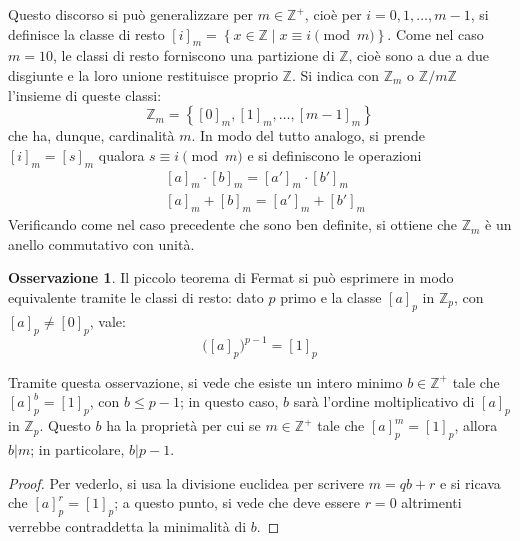 \documentclass[11pt, a4paper]{scrartcl}
\theoremstyle{definition}
\numberwithin{esempio}{section}
\theoremstyle{definition}
\newtheorem{obs}{Osservazione}
\numberwithin{obs}{section}
\numberwithin{nota}{section}
\numberwithin{equation}{subsection}
\begin{document}
Questo discorso si pu\`o generalizzare per $m \in \mathbb{Z}^+$, cio\`e per $i = 0,1,\ldots,m-1$, si definisce la classe di resto $[i]_m = \left\{ x \in \mathbb{Z}  \mid x\equiv i \pmod{m}  \right\} $. 
Come nel caso $m=10$, le classi di resto forniscono una partizione di $\mathbb{Z}$, cio\`e sono a due a due disgiunte e la loro unione restituisce proprio $\mathbb{Z}$.
Si indica con $\mathbb{Z}_m$ o $\mathbb{Z} / m \mathbb{Z}$ l'insieme di queste classi:
\begin{equation}
	\mathbb{Z}_m = \left\{ [0]_m , [1]_m ,\ldots, [m-1]_{m}  \right\} 
\end{equation}
che ha, dunque, cardinalit\`a $m$.
In modo del tutto analogo, si prende $[i]_m = [s]_m$ qualora $s\equiv i \pmod{m} $ e si definiscono le operazioni
\[
	\begin{split}
		&[a]_{m} \cdot [b]_{m} = [a']_{m} \cdot [b']_{m} \\
		&[a]_{m} + [b]_{m} = [a']_{m} + [b']_{m} 
	\end{split}
\] 
Verificando come nel caso precedente che sono ben definite, si ottiene che $\mathbb{Z}_m$ \`e un anello commutativo con unit\`a.

\begin{obs}
	Il piccolo teorema di Fermat si pu\`o esprimere in modo equivalente tramite le classi di resto: dato $p$ primo e la classe $[a]_p$ in $\mathbb{Z}_p$, con $[a]_p \neq [0]_p$, vale:
	\begin{equation}
		\big([a]_p\big)^{p-1} = [1]_p
	\end{equation}
\end{obs}
Tramite questa osservazione, si vede che esiste un intero minimo $b \in \mathbb{Z}^+$ tale che $[a]^b_p = [1]_p$, con $b \le p-1$; in questo caso, $b$ sar\`a l'ordine moltiplicativo di $[a]_p$ in $\mathbb{Z}_p$.
Questo $b$ ha la propriet\`a per cui se $m \in \mathbb{Z}^+$ tale che $[a]_p^m = [1]_p$, allora $b | m$; in particolare, $b | p-1$.
\begin{proof}
	Per vederlo, si usa la divisione euclidea per scrivere $m=qb +r$ e si ricava che $[a]_p^r = [1]_p$; a questo punto, si vede che deve essere $r=0$ altrimenti verrebbe contraddetta la minimalit\`a di $b$.
\end{proof}
\end{document}
